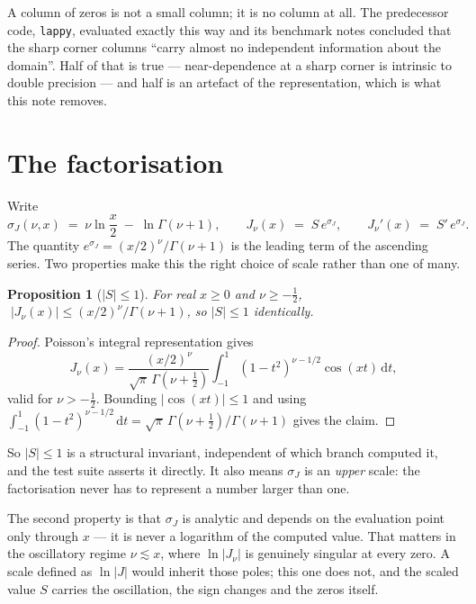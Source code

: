 \documentclass[11pt]{article}
\newtheorem{proposition}{Proposition}
\theoremstyle{remark}
\newcommand{\dd}{\,\mathrm{d}}
\newcommand{\code}[1]{\texttt{#1}}
\begin{document}
A column of zeros is not a small column; it is no column at all. The predecessor code,
\code{lappy}, evaluated exactly this way and its benchmark notes concluded that the sharp
corner columns ``carry almost no independent information about the domain''. Half of that is
true --- near-dependence at a sharp corner is intrinsic to double precision --- and half is
an artefact of the representation, which is what this note removes.

\section{The factorisation}

Write
\begin{equation}
  \sigma_J(\nu,x) \;=\; \nu\ln\frac{x}{2} \;-\; \ln\Gamma(\nu+1),
  \qquad
  J_\nu(x) \;=\; S\,e^{\sigma_J},
  \qquad
  J_\nu'(x) \;=\; S'\,e^{\sigma_J}.
  \label{eq:factor}
\end{equation}
The quantity $e^{\sigma_J}=(x/2)^\nu/\Gamma(\nu+1)$ is the leading term of the ascending
series. Two properties make this the right choice of scale rather than one of many.

\begin{proposition}[$|S|\le 1$]
For real $x\ge 0$ and $\nu\ge -\tfrac12$,
$\;|J_\nu(x)| \le (x/2)^\nu/\Gamma(\nu+1)$, so $|S|\le 1$ identically.
\end{proposition}

\begin{proof}
Poisson's integral representation gives
\[
  J_\nu(x)=\frac{(x/2)^\nu}{\sqrt{\pi}\,\Gamma(\nu+\tfrac12)}
           \int_{-1}^{1}(1-t^2)^{\nu-1/2}\cos(xt)\dd t ,
\]
valid for $\nu>-\tfrac12$. Bounding $|\cos(xt)|\le 1$ and using
$\int_{-1}^{1}(1-t^2)^{\nu-1/2}\dd t=\sqrt{\pi}\,\Gamma(\nu+\tfrac12)/\Gamma(\nu+1)$
gives the claim.
\end{proof}

So $|S|\le 1$ is a structural invariant, independent of which branch computed it, and the
test suite asserts it directly. It also means $\sigma_J$ is an \emph{upper} scale: the
factorisation never has to represent a number larger than one.

The second property is that $\sigma_J$ is analytic and depends on the evaluation point only
through $x$ --- it is never a logarithm of the computed value. That matters in the
oscillatory regime $\nu\lesssim x$, where $\ln|J_\nu|$ is genuinely singular at every zero.
A scale defined as $\ln|J|$ would inherit those poles; this one does not, and the scaled
value $S$ carries the oscillation, the sign changes and the zeros itself.
\end{document}
